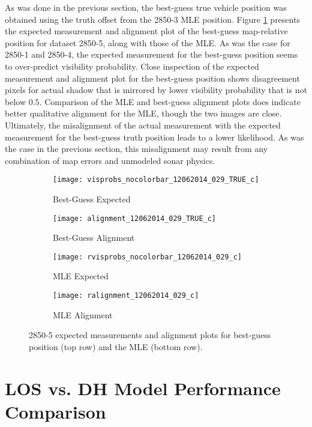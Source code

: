As was done in the previous section, the best-guess true vehicle position was obtained using the truth offset from the 2850-3 MLE position.
Figure \ref{fig:badExp2} presents the expected measurement and alignment plot of the best-guess map-relative position for dataset 2850-5, along with those of the MLE.
As was the case for 2850-1 and 2850-4, the expected measurement for the best-guess position seems to over-predict visibility probability.  
Close inspection of the expected measurement and alignment plot for the best-guess position shows disagreement pixels for actual shadow that is mirrored by lower visibility probability that is not below $0.5$.
Comparison of the MLE and best-guess alignment plots does indicate better qualitative alignment for the MLE, though the two images are close.
Ultimately, the misalignment of the actual measurement with the expected measurement for the best-guess truth position leads to a lower likelihood.
As was the case in the previous section, this misalignment may result from any combination of map errors and unmodeled sonar physics.

\begin{figure} [h!]
	\centering
	\begin{subfigure}[b]{0.48\textwidth}
                \texttt{[image: visprobs\_nocolorbar\_12062014\_029\_TRUE\_c]}
                \caption{Best-Guess Expected}
	\end{subfigure}
  	\centering
	\begin{subfigure}[b]{0.48\textwidth}
                \texttt{[image: alignment\_12062014\_029\_TRUE\_c]}
		\caption{Best-Guess Alignment}
  	\end{subfigure}
  	
  	\centering
	\begin{subfigure}[b]{0.48\textwidth}
                \texttt{[image: rvisprobs\_nocolorbar\_12062014\_029\_c]}
                \caption{MLE Expected}
	\end{subfigure}
  	\centering
	\begin{subfigure}[b]{0.48\textwidth}
                \texttt{[image: ralignment\_12062014\_029\_c]}
		\caption{MLE Alignment}
  	\end{subfigure}

	\caption{2850-5 expected measurements and alignment plots for best-guess position (top row) and the MLE (bottom row).   }
	\label{fig:badExp2}
\end{figure}

\section{LOS vs. DH Model Performance Comparison}
\label{rov.LOS}

